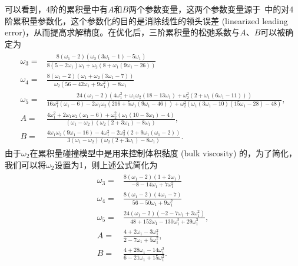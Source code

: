 可以看到，4阶的累积量中有$A$和$B$两个参数变量，这两个参数变量源于~\citep{Geier-2017}中的对4阶累积量参数化，这个参数化的目的是消除线性的领头误差 (linearized leading error)，从而提高求解精度。在优化后，三阶累积量的松弛系数与$A$、$B$可以被确定为
\begin{align}
    \begin{split}
\omega_{3} =& \frac{8\left(\omega_{1}-2\right)\left(\omega_{2}\left(3 \omega_{1}-1\right)-5 \omega_{1}\right)}{8\left(5-2 \omega_{1}\right) \omega_{1}+\omega_{2}\left(8+\omega_{1}\left(9 \omega_{1}-26\right)\right)} \\
\omega_{4} =& \frac{8\left(\omega_{1}-2\right)\left(\omega_{1}+\omega_{2}\left(3 \omega_{1}-7\right)\right)}{\omega_{2}\left(56-42 \omega_{1}+9 \omega_{1}^{2}\right)-8 \omega_{1}} \\
\omega_{5} =& \frac{24\left(\omega_{1}-2\right)\left(4 \omega_{1}^{2}+\omega_{1} \omega_{2}\left(18-13 \omega_{1}\right)+\omega_{2}^{2}\left(2+\omega_{1}\left(6 \omega_{1}-11\right)\right)\right)}{16 \omega_{1}^{2}\left(\omega_{1}-6\right)-2 \omega_{1} \omega_{2}\left(216+5 \omega_{1}\left(9 \omega_{1}-46\right)\right)+\omega_{2}^{2}\left(\omega_{1}\left(3 \omega_{1}-10\right)\left(15 \omega_{1}-28\right)-48\right)}, \\
A =& \frac{4 \omega_{1}^{2}+2 \omega_{1} \omega_{2}\left(\omega_{1}-6\right)+\omega_{2}^{2}\left(\omega_{1}\left(10-3 \omega_{1}\right)-4\right)}{\left(\omega_{1}-\omega_{2}\right)\left(\omega_{2}\left(2+3 \omega_{1}\right)-8 \omega_{1}\right)}, \\
B = & \frac{4 \omega_{1} \omega_{2}\left(9 \omega_{1}-16\right)-4 \omega_{1}^{2}-2 \omega_{2}^{2}\left(2+9 \omega_{1}\left(\omega_{1}-2\right)\right)}{3\left(\omega_{1}-\omega_{2}\right)\left(\omega_{2}\left(2+3 \omega_{1}\right)-8 \omega_{1}\right)} .
\end{split}
\end{align}
由于$\omega_{2}$在累积量碰撞模型中是用来控制体积黏度 (bulk viscosity) 的，为了简化，我们可以将$\omega_{2}$设置为1，则上述公式简化为
\begin{align}
    \begin{split}
    \omega_{3} =& \frac{8\left(\omega_{1}-2\right)\left(1+2 \omega_{1}\right)}{-8-14\omega_{1}+7\omega_{1}^2} \\
    \omega_{4} =& \frac{8\left(\omega_{1}-2\right)\left(4 \omega_{1}-7\right)}{56-50\omega_{1}+9\omega_{1}^2} \\
    \omega_{5} =& \frac{24\left(\omega_{1}-2\right)\left(-2-7\omega_{1}+3\omega_{1}^2\right)}{48+152\omega_{1}-130\omega_{1}^2+29\omega_{1}^3}, \\
    A =& \frac{4+2\omega_{1}-3\omega_{1}^2}{2-7\omega_{1}+5\omega_{1}^2}, \\
    B =& \frac{4+28\omega_{1}-14\omega_{1}^2}{6-21\omega_{1}+15\omega_{1}^2} .
\end{split}
\end{align}

